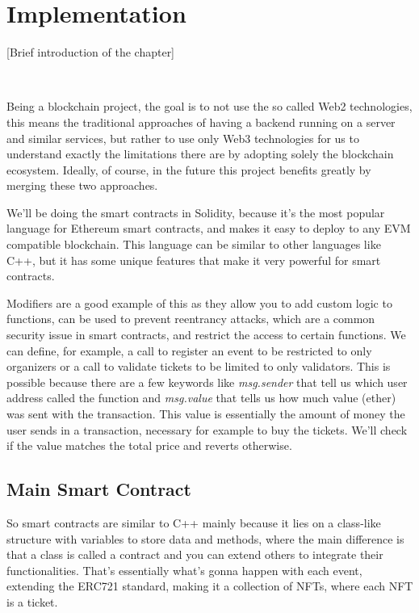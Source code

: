 \chapter{Implementation}
\label{ch:implementation}

[Brief introduction of the chapter]

~

Being a blockchain project, the goal is to not use the so called Web2 technologies, this means the traditional approaches of having a backend running on a server and similar services, but rather to use only Web3 technologies for us to understand exactly the limitations there are by adopting solely the blockchain ecosystem. Ideally, of course, in the future this project benefits greatly by merging these two approaches.

We'll be doing the smart contracts in Solidity, because it's the most popular language for Ethereum smart contracts, and makes it easy to deploy to any EVM compatible blockchain. This language can be similar to other languages like C++, but it has some unique features that make it very powerful for smart contracts.

Modifiers are a good example of this as they allow you to add custom logic to functions, can be used to prevent reentrancy attacks, which are a common security issue in smart contracts, and restrict the access to certain functions. We can define, for example, a call to register an event to be restricted to only organizers or a call to validate tickets to be limited to only validators. This is possible because there are a few keywords like \textit{msg.sender} that tell us which user address called the function and \textit{msg.value} that tells us how much value (ether) was sent with the transaction. This value is essentially the amount of money the user sends in a transaction, necessary for example to buy the tickets. We'll check if the value matches the total price and reverts otherwise.

\section{Main Smart Contract}
\label{sec:main_smart_contract}

So smart contracts are similar to C++ mainly because it lies on a class-like structure with variables to store data and methods, where the main difference is that a class is called a contract and you can extend others to integrate their functionalities. That's essentially what's gonna happen with each event, extending the ERC721 standard, making it a collection of NFTs, where each NFT is a ticket.

